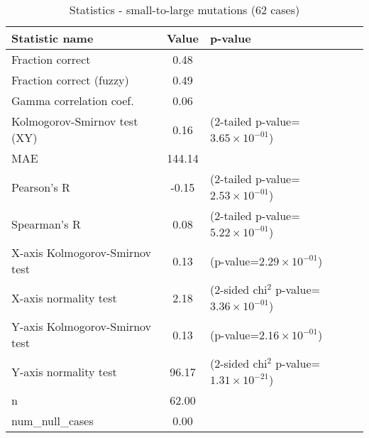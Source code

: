\documentclass[10pt, letterpaper, oneside, titlepage, landscape]{scrreprt}
\begin{document}
\begin{table}[H]\begin{center}
\begin{tabular}{ l S[table-format=3.2] l}
Statistic name & {Value} & p-value\\
\hline
Fraction correct & 0.48 & \\
Fraction correct (fuzzy) & 0.49 & \\
Gamma correlation coef. & 0.06 & \\
Kolmogorov-Smirnov test (XY) & 0.16 & (2-tailed p-value=$3.65\times10^{-01}$)\\
MAE & 144.14 & \\
Pearson's R & -0.15 & (2-tailed p-value=$2.53\times10^{-01}$)\\
Spearman's R & 0.08 & (2-tailed p-value=$5.22\times10^{-01}$)\\
X-axis Kolmogorov-Smirnov test & 0.13 & (p-value=$2.29\times10^{-01}$)\\
X-axis normality test & 2.18 & (2-sided chi$^{2}$ p-value=$3.36\times10^{-01}$)\\
Y-axis Kolmogorov-Smirnov test & 0.13 & (p-value=$2.16\times10^{-01}$)\\
Y-axis normality test & 96.17 & (2-sided chi$^{2}$ p-value=$1.31\times10^{-21}$)\\
n & 62.00 & \\
num\_null\_cases & 0.00 & \\
\end{tabular}
\caption{Statistics - small-to-large mutations (62 cases)}
\end{center}\end{table}
\end{document}
